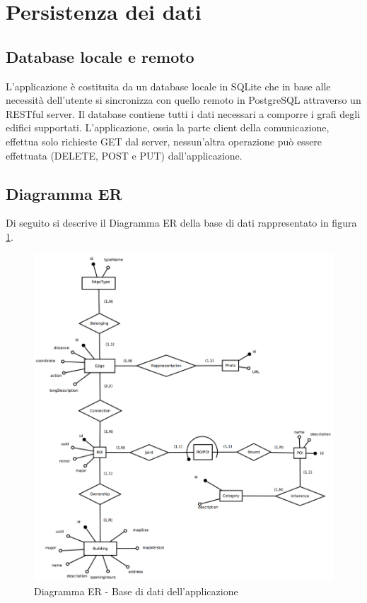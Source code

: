 \documentclass[../ManualeSviluppatore.tex]{subfiles}
\begin{document}
\section{Persistenza dei dati}
\label{sec:PersistenzaDeiDati}

	\subsection{Database locale e remoto}
		L'applicazione è costituita da un database locale in SQLite che in base alle necessità dell'utente si sincronizza con quello remoto in PostgreSQL attraverso un RESTful server. Il database contiene tutti i dati necessari a comporre i grafi degli edifici supportati. L'applicazione, ossia la parte client della comunicazione, effettua solo richieste GET dal server, nessun'altra operazione può essere effettuata (DELETE, POST e PUT) dall'applicazione. 
	
		\subsection{Diagramma ER}
			Di seguito si descrive il Diagramma ER della base di dati rappresentato in figura \ref{fig:Database}.
		\begin{figure} [p]
			\centering
				\includegraphics[width=\textwidth]{img/db}		
				\caption{Diagramma ER - Base di dati dell'applicazione}
				\label{fig:Database}
		\end{figure}
\end{document}
